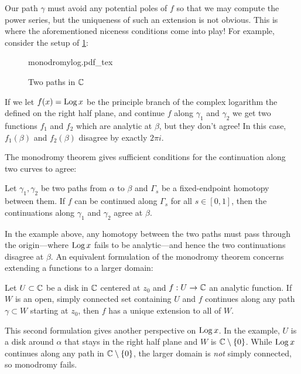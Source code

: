 Our path \(\gamma\) must avoid any potential poles of \(f\) so that we may
compute the power series, but the uniqueness of such an extension is not
obvious. This is where the aforementioned niceness conditions come into play!
For example, consider the setup of \cref{fig:monolog}:

\begin{figure}[h!]%
\centering
  \def\svgwidth{0.52\columnwidth}
  {monodromylog.pdf_tex}
\caption{Two paths in \(\mathbb{C} \)}
\label{fig:monolog}
\end{figure}

\begin{example}%
\label{ex:logmono}
If we let \(f(x)=\operatorname{Log} x\) be the principle branch of the complex logarithm the
defined on the right half plane, and continue \(f\) along \(\gamma_1\) and
\(\gamma_2\) we get two functions \(f_1\) and \(f_2\) which are analytic at
\(\beta\), but they don't agree! In this case, \(f_1(\beta)\) and \(f_2(\beta)\)
disagree by exactly \(2\pi i\).
\end{example}

The monodromy theorem gives sufficient conditions for the continuation along
two curves to agree:

\begin{theorem}[Monodromy I]%
\label{thm:mon1}
  Let \(\gamma_1, \gamma_2\) be two paths from \(\alpha\) to \(\beta\) and
  \(\Gamma_s\) be a fixed-endpoint homotopy between them. If \(f\) can be
  continued along \(\Gamma_s\) for all \(s \in [0,1]\), then the continuations
  along \(\gamma_1\) and \(\gamma_2\) agree at \(\beta\).
\end{theorem}

In the example above, any homotopy between the two paths must pass through the
origin---where \(\operatorname{Log} x\) fails to be analytic---and hence the two continuations
disagree at \(\beta\).
An equivalent formulation of the monodromy theorem concerns extending a
functions to a larger domain:
\clearpage
\begin{theorem}[Monodromy II]%
\label{thm:mon2}
  Let \(U \subset \mathbb{C} \) be a disk in \(\mathbb{C} \) centered at \(z_0\) and
  \(f: U \to \mathbb{C} \) an analytic function. If \(W\) is
  an open, simply connected set containing \(U\) and \(f\) continues along any
  path \(\gamma \subset W\) starting at \(z_0\), then \(f\) has a unique
  extension to all of \(W\).
\end{theorem}

This second formulation gives another perspective on \(\operatorname{Log} x\). In the example,
\(U\) is a disk around \(\alpha\) that stays in the right half plane and \(W\)
is \(\mathbb{C} \setminus \{0\} \). While \(\operatorname{Log} x\) continues along any path in
\(\mathbb{C}  \setminus \{0\} \), the larger domain is \emph{not} simply connected, so
monodromy fails.


